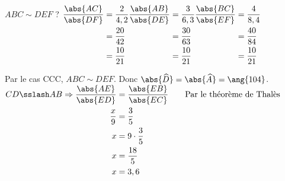 %
%
    \begin{tasks}
        \task $ABC \sim DEF$ ?
        $
            \begin{aligned}[t]
                \dfrac{\abs{AC}}{\abs{DF}}
                 & = \dfrac{2}{4,2} \\
                 & = \dfrac{20}{42} \\
                 & = \dfrac{10}{21} \\
            \end{aligned}
            \hfil
            \begin{aligned}[t]
                \dfrac{\abs{AB}}{\abs{DE}}
                 & = \dfrac{3}{6,3} \\
                 & = \dfrac{30}{63} \\
                 & = \dfrac{10}{21} \\
            \end{aligned}
            \hfil
            \begin{aligned}[t]
                \dfrac{\abs{BC}}{\abs{EF}}
                 & = \dfrac{4}{8,4} \\
                 & = \dfrac{40}{84} \\
                 & = \dfrac{10}{21}
            \end{aligned}
        $\bigbreak

        Par le cas CCC, $ABC \sim DEF$. Donc $\abs{\widehat{D}} = \abs{\widehat{A}} = \ang{104}$.
        \task
        $
            \begin{aligned}[t]
                CD \sslash AB \Rightarrow
                \dfrac{\abs{AE}}{\abs{ED}} & = \dfrac{\abs{EB}}{\abs{EC}}
                \qquad\text{Par le théorème de Thalès}                    \\
                \dfrac{x}{9}               & = \dfrac{3}{5}               \\
                x                          & = 9\cdot\dfrac{3}{5}         \\
                x                          & = \dfrac{18}{5}              \\
                x                          & = 3,6
            \end{aligned}
        $
    \end{tasks}
